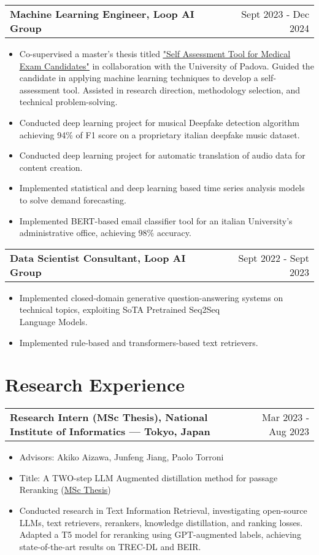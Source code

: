 \documentclass[a4paper,12pt]{article}
\makeatletter
\newenvironment{joblong}[2]
    {
    \begin{tabularx}{\linewidth}{@{}l X r@{}}
    \textbf{#1} & \hfill &  #2 \\[3.75pt]
    \end{tabularx}
    \begin{minipage}[t]{\linewidth}
    \begin{itemize}[nosep,after=\strut, leftmargin=1em, itemsep=3pt,label=--]
    }
    {
    \end{itemize}
    \end{minipage}    
    }
\makeatother
\begin{document}
\begin{joblong}{Machine Learning Engineer, Loop AI Group}{Sept 2023 - Dec 2024}
\item {
        Co-supervised a master's thesis titled \href{https://thesis.unipd.it/handle/20.500.12608/70905}{\underline{"Self Assessment Tool for Medical Exam Candidates"}} in collaboration with the University of Padova.
Guided the candidate in applying machine learning techniques to develop a self-assessment tool.
Assisted in research direction, methodology selection, and technical problem-solving.
        }
\item Conducted deep learning project for musical Deepfake detection algorithm achieving 94\% of F1 score on a proprietary italian deepfake music dataset.
\item Conducted deep learning project for automatic translation of audio data for content creation.
\item Implemented statistical and deep learning based time series analysis models to solve demand forecasting.
\item Implemented BERT-based email classifier tool for an italian University's administrative office, achieving 98\% accuracy.
\end{joblong}

\begin{joblong}{Data Scientist Consultant, Loop AI Group}{Sept 2022 - Sept 2023}
\item Implemented closed-domain generative question-answering systems on technical topics, exploiting SoTA Pretrained Seq2Seq \\Language Models.
\item Implemented rule-based and transformers-based text retrievers.
\end{joblong}
  
\section{Research Experience}

\begin{joblong}{Research Intern (MSc Thesis), National Institute of Informatics — Tokyo, Japan}{Mar 2023 - Aug 2023}
\item Advisors: Akiko Aizawa, Junfeng Jiang, Paolo Torroni
\item Title: A TWO-step LLM Augmented distillation method for passage Reranking (\href{https://amslaurea.unibo.it/30082/}{MSc Thesis})
\item Conducted research in Text Information Retrieval, investigating open-source LLMs, text retrievers, rerankers, knowledge distillation, and ranking losses. Adapted a T5 model for reranking using GPT-augmented labels, achieving state-of-the-art results on TREC-DL and BEIR.
\end{joblong}
\end{document}
